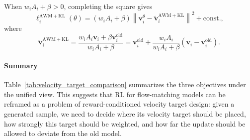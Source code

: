 \documentclass{article} %
\begin{document}
When $w_iA_i+\beta>0$, completing the square gives
\begin{equation}
\ell_i^{\mathrm{AWM+KL}}(\theta)
=
(w_iA_i+\beta)
\left\|
\mathbf{v}_i^\theta
-
\widetilde{\mathbf{v}}_i^{\mathrm{AWM+KL}}
\right\|^2
+
\mathrm{const.},
\end{equation}
where
\begin{equation}
\widetilde{\mathbf{v}}_i^{\mathrm{AWM+KL}}
=
\frac{
w_iA_i\mathbf{v}_i+\beta\mathbf{v}_i^{\mathrm{old}}
}{
w_iA_i+\beta
} = \mathbf{v}_i^{\mathrm{old}} + \frac{w_iA_i}{w_iA_i+\beta} (\mathbf{v}_i-\mathbf{v}_i^{\mathrm{old}}) .
\end{equation}



\paragraph{Summary}
Table~\ref{tab:velocity_target_comparison} summarizes the three objectives under
the unified view. 
This
suggests that RL for flow-matching models can be reframed as a
problem of reward-conditioned velocity target design: given a generated sample,
we need to decide where its velocity target should be placed, how strongly this
target should be weighted, and how far the update should be allowed to deviate
from the old model.
\end{document}
